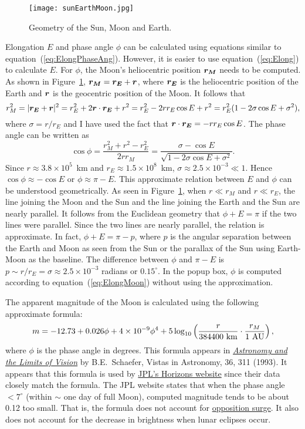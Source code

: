 \documentclass[12pt]{article}
\newcommand \beq {\begin{equation}}
\newcommand \eeq {\end{equation}}
\newcommand{\ve}[1]{\mbox{\boldmath $#1$}}
\begin{document}
\begin{figure}[h]
\begin{center}
\texttt{[image: sunEarthMoon.jpg]}
\end{center}
\caption{Geometry of the Sun, Moon and Earth.}
\label{fig:SunMoonEarth}
\end{figure}

Elongation $E$ and phase angle $\phi$ can be calculated using equations similar to 
equation~(\ref{eq:ElongPhaseAng}). However, it is easier to use 
equation~(\ref{eq:Elong}) to calculate $E$. For $\phi$, 
the Moon's heliocentric position $\ve{r_M}$ needs to be computed. As shown in 
Figure~\ref{fig:SunMoonEarth}, $\ve{r_M}=\ve{r_E}+\ve{r}$, where 
$\ve{r_E}$ is the heliocentric 
position of the Earth and $\ve{r}$ is the geocentric position of the Moon. 
It follows that 
\beq
  r_M^2 = |\ve{r_E}+\ve{r}|^2 = r_E^2 + 2\ve{r}\cdot \ve{r_E} + r^2 = 
r_E^2 - 2 r r_E \cos E+r^2 = r_E^2(1-2\sigma \cos E + \sigma^2) ,
\eeq
where $\sigma=r/r_E$ and I have used the fact that 
$\ve{r}\cdot \ve{r_E}=-r r_E \cos E$. The phase angle can be written as 
\beq
  \cos \phi = \frac{r_M^2+r^2-r_E^2}{2rr_M} = \frac{\sigma - \cos E}
{\sqrt{1-2\sigma\cos E + \sigma^2}} .
\label{eq:ElongMoon}
\eeq
Since $r \approx 3.8\times 10^{5}$~km and $r_E\approx 1.5\times 10^8$~km, 
$\sigma \approx 2.5\times 10^{-3} \ll 1$. Hence $\cos \phi \approx -\cos E$ or 
$\phi \approx \pi - E$. This approximate relation between $E$ and $\phi$ can 
be understood geometrically. As seen in Figure~\ref{fig:SunMoonEarth}, when 
$r \ll r_M$ and $r \ll r_E$, the line joining the Moon and the Sun and the 
line joining the Earth and the Sun are nearly parallel. It follows from the 
Euclidean geometry that $\phi + E = \pi$ if the two lines were parallel. Since 
the two lines are nearly parallel, the relation is approximate. 
In fact, $\phi + E = \pi - p$, where $p$ is the angular separation between 
the Earth and Moon as seen from the Sun or the parallax of the Sun 
using Earth-Moon as the baseline.
The difference between $\phi$ and $\pi - E$ is $p \sim r/r_E =\sigma 
\approx 2.5\times 10^{-3}$ radians or $0.15^\circ$. 
In the popup box, $\phi$ is computed according to equation~(\ref{eq:ElongMoon}) 
without using the approximation. 

The apparent magnitude of the Moon is calculated using the following 
approximate formula:
\beq
  m = -12.73 + 0.026 \phi + 4\times 10^{-9} \phi^4 
+ 5\log_{10}\left( \frac{r}{384400~{\rm km}}\cdot \frac{r_M}{1~{\rm AU}}\right) ,
\eeq
where $\phi$ is the phase angle in degrees. This formula appears in 
\href{http://dust.ess.uci.edu/ppr/ppr_Sch93.pdf}{\it Astronomy and the 
Limits of Vision} by B.E.~Schaefer, Vistas in Astronomy, 36, 311 (1993). 
It appears that this formula is used by 
\href{https://ssd.jpl.nasa.gov/horizons.cgi}{JPL's Horizons website} 
since their data closely match the formula.
The JPL website states that when the phase angle $< 7^\circ$ (within $\sim$ one 
day of full Moon), computed magnitude tends to be about 0.12 too small. That is, 
the formula does not account for 
\href{https://en.wikipedia.org/wiki/Opposition_surge}{opposition surge}. 
It also does not account for 
the decrease in brightness when lunar eclipses occur.
\end{document}
